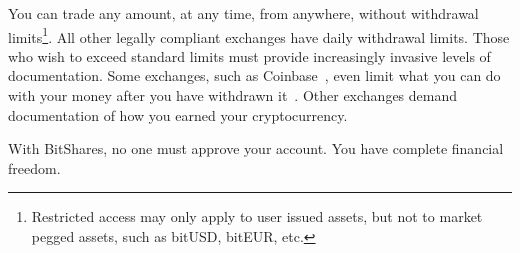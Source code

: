 You can trade any amount, at any time, from anywhere, without withdrawal
limits\footnote{Restricted access may only apply to user issued assets, but not
to market pegged assets, such as bitUSD, bitEUR, etc.}. All other legally
compliant exchanges have daily withdrawal limits. Those who wish to exceed
standard limits must provide increasingly invasive levels of documentation.
Some exchanges, such as Coinbase~\cite{coinbase}, even limit what you can do
with your money after you have withdrawn it~\cite{ct:compliance}. Other
exchanges demand documentation of how you earned your cryptocurrency.

With BitShares, no one must approve your account. You have complete financial
freedom.
